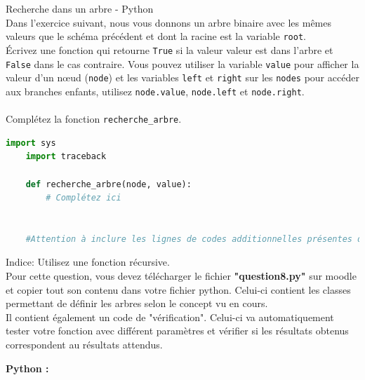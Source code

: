 \begin{Exercice}[15 minutes] Recherche dans un arbre - Python\\
    
    Dans l'exercice suivant, nous vous donnons un arbre binaire avec les mêmes valeurs que le schéma précédent et dont la racine est la variable \lstinline{root}.\\

    Écrivez une fonction qui retourne \lstinline{True} si la valeur valeur est dans l'arbre et \lstinline{False} dans le cas contraire. Vous pouvez utiliser la variable \lstinline{value} pour afficher la valeur d'un nœud (\lstinline{node}) et les variables \lstinline{left} et \lstinline{right} sur les \lstinline{nodes} pour accéder aux branches enfants, utilisez \lstinline{node.value}, \lstinline{node.left} et \lstinline{node.right}.\\\\
    Complétez la fonction \lstinline{recherche_arbre}.\\
    \begin{lstlisting}[language=Python]
    import sys
    import traceback

    def recherche_arbre(node, value):
        # Complétez ici
        
        
    #Attention à inclure les lignes de codes additionnelles présentes dans le fichier "question8.py" sur Moodle
    \end{lstlisting}

    \begin{conseil}
    Indice: Utilisez une fonction récursive.\\
    
    Pour cette question, vous devez télécharger le fichier \textbf{"question8.py"} sur moodle et copier tout son contenu dans votre fichier python. Celui-ci contient les classes permettant de définir les arbres selon le concept vu en cours. \\
    
    Il contient également un code de "vérification". Celui-ci va automatiquement tester votre fonction avec différent paramètres et vérifier si les résultats obtenus correspondent au résultats attendus.
    \end{conseil}

    \begin{solution}
        \textbf{Python :}
        
    \end{solution}

\end{Exercice}


